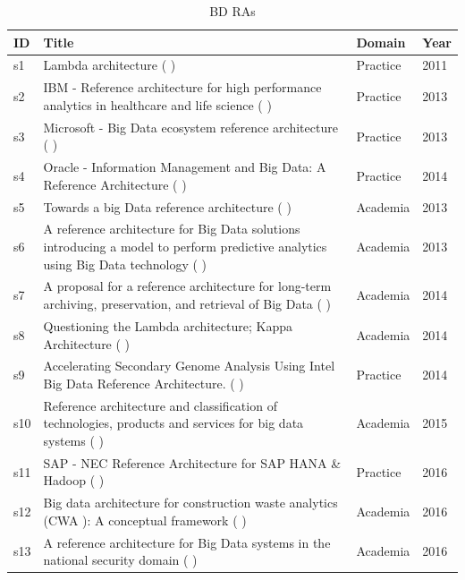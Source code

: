 \documentclass{bmcart}
\begin{document}
\begin{table}
  \renewcommand*{\arraystretch}{1.4}
  \caption{BD RAs}
  \label{table:bdRAs}
  \begin{tabular}{|p{0.4cm}|p{9cm}|p{1.2cm}|p{0.5cm}|}
  \hline
  \textbf{ID} & \textbf{Title} & \textbf{Domain} & \textbf{Year} \\
  \hline
  s1 & Lambda architecture (\cite{kiran2015lambda} ) & Practice  &  2011   \\
  \hline
  s2 & IBM - Reference architecture for high performance analytics in healthcare and life science (\cite{quintero2019ibm} ) & Practice  &  2013   \\
  \hline
  s3 &  Microsoft - Big Data ecosystem reference architecture  (\cite{levin2013big} ) & Practice  &  2013   \\
  \hline
  s4 &  Oracle - Information Management and Big Data: A Reference Architecture  (\cite{cackett2013information} ) & Practice  &  2014   \\
  \hline
  s5 & Towards a big Data reference architecture (\cite{Maier} ) & Academia  &  2013   \\
  \hline
  s6 & A reference architecture for Big Data solutions introducing a model to perform predictive analytics using Big Data technology (\cite{geerdink2013reference} ) & Academia  &  2013   \\
  \hline
  s7 & A proposal for a reference architecture for long-term archiving, preservation, and retrieval of Big Data (\cite{viana2014proposal} ) & Academia  &  2014   \\
  \hline
  s8 & Questioning the Lambda architecture; Kappa Architecture (\cite{kreps2014questioning} ) & Academia  &  2014   \\
  \hline
  s9 & Accelerating Secondary Genome Analysis Using Intel Big Data Reference Architecture. (\cite{SikoraWohlfeld2014} ) & Practice  &  2014  \\
  \hline
  s10 & Reference architecture and classification of technologies, products and services for big data systems (\cite{paakkonen2015reference} ) & Academia  &  2015   \\
  \hline
  s11 &  SAP - NEC Reference Architecture for SAP HANA \& Hadoop (\cite{SAPRA} ) & Practice  &  2016   \\
  \hline
  s12 & Big data architecture for construction waste analytics (CWA ): A conceptual framework (\cite{bilal2016big} ) & Academia  &  2016   \\
  \hline
  s13 & A reference architecture for Big Data systems in the national security domain (\cite{Klein} ) & Academia  &  2016   \\

\end{tabular}
\end{table}
\end{document}
